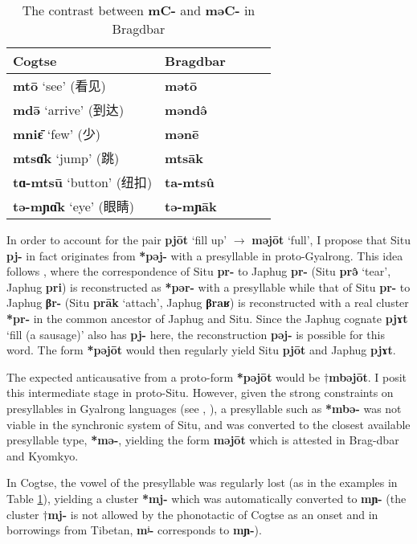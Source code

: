 \documentclass[oneside,a4paper,11pt]{article}
\newcommand{\ipa}[1]{\textbf{{\phon\mbox{#1}}}} %
\newcommand{\zh}[1]{{\cn #1}}
\begin{document}
\begin{table}[H]
\caption{The contrast between \ipa{mC-} and \ipa{məC-} in Bragdbar} \label{tab:mEC} \centering
\begin{tabular}{lllll}
\toprule
Cogtse & Bragdbar   \\
\midrule
\ipa{mtō} `see' (\zh{看见}) & \ipa{mətō}   \\
\ipa{mdə̄} `arrive' (\zh{到达}) & \ipa{məndə̂}    \\
\ipa{mniɛ̄} `few' (\zh{少}) & \ipa{mənē}    \\
\midrule
\ipa{mtsɑ̂k} `jump' (\zh{跳}) & \ipa{mtsāk}    \\
\ipa{tɑ-mtsū} `button' (\zh{纽扣}) & \ipa{ta-mtsû}    \\
\ipa{tə-mɲɑ̄k} `eye' (\zh{眼睛}) & \ipa{tə-mɲāk}    \\
\bottomrule
\end{tabular}
\end{table}

In order to account for the pair \ipa{pjōt} `fill up' $\rightarrow$ \ipa{məjōt} `full', I propose that Situ \ipa{pj-} in fact originates from \ipa{*pəj-} with a presyllable in proto-Gyalrong. This idea follows \citet[263;275;331]{jacques04these}, where the correspondence of Situ \ipa{pr-} to Japhug \ipa{pr-} (Situ \ipa{prə̂} `tear', Japhug \ipa{pri}) is reconstructed as \ipa{*pər-} with a presyllable while that of Situ \ipa{pr-} to Japhug \ipa{βr-} (Situ \ipa{prāk} `attach', Japhug \ipa{βraʁ}) is reconstructed with a real cluster \ipa{*pr-} in the common ancestor of Japhug and Situ. Since the Japhug cognate \ipa{pjɤt} `fill (a sausage)' also has \ipa{pj-} here, the reconstruction \ipa{pəj-} is possible for this word. The form \ipa{*pəjōt} would then regularly yield Situ  \ipa{pjōt} and Japhug  \ipa{pjɤt}.

The expected anticausative from a proto-form \ipa{*pəjōt} would be $\dagger$\ipa{mbəjōt}. I posit this intermediate stage in proto-Situ. However, given the strong constraints on presyllables in Gyalrong languages (see \citealt[1220]{jacques12incorp},  \citealt[92]{jacques12agreement}), a presyllable such as \ipa{*mbə-} was not viable in the synchronic system of Situ, and was converted to the closest available presyllable type, \ipa{*mə-}, yielding the form \ipa{məjōt} which is attested in Brag-dbar and Kyomkyo.

In Cogtse, the vowel of the presyllable was regularly lost (as in the examples in Table \ref{tab:mEC}), yielding a cluster \ipa{*mj-} which was automatically converted to \ipa{mɲ-} (the cluster $\dagger$\ipa{mj-} is not allowed by the phonotactic of Cogtse as an onset and in borrowings from Tibetan, \ipa{mʲ-} corresponds to \ipa{mɲ-}).
\end{document}
